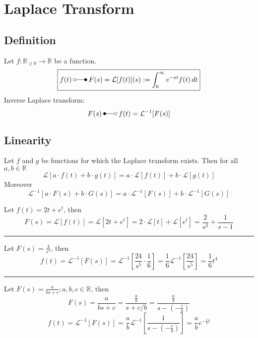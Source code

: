 \section{Laplace Transform}
\subsection{Definition}
Let $f:\mathbb{R}_{\geq 0} \rightarrow \mathbb{R}$ be a function.
\begin{equation*}
    \boxed{
    f(t)\:\laplace\:F(s)=\mathcal{L}[f(t)](s):=\int_{0}^{\infty}e^{-st}f(t)\,dt 
    }
\end{equation*}
Inverse Laplace transform:
\begin{equation*}
    F(s)\:\Laplace\:f(t)=\mathcal{L}^{-1}[F(s)]
\end{equation*} 

\subsection{Linearity}
Let $f$ and $g$ be functions for which the Laplace transform exists. Then for all $a,b \in \mathbb{R}$
\begin{equation*}
    \mathcal{L}[a\cdot f(t)+b\cdot g(t)] = a\cdot\mathcal{L}[f(t)]+b\cdot\mathcal{L}[g(t)]
\end{equation*}
Moreover
\begin{equation*}
    \mathcal{L}^{-1}[a\cdot F(s)+b\cdot G(s)] = a\cdot\mathcal{L}^{-1}[F(s)]+b\cdot\mathcal{L}^{-1}[G(s)]
\end{equation*}

\begin{examplesection}[Example]
    Let $f(t)=2t+e^t$, then
    \begin{equation*}
        F(s)=\mathcal{L}[f(t)]=\mathcal{L}[2t+e^t]=2\cdot\mathcal{L}[t] + \mathcal{L}[e^t]=\frac{2}{s^2}+\frac{1}{s-1}
    \end{equation*}
    \hrule{}
    Let $F(s)=\frac{4}{s^5}$, then
    \begin{equation*}
        f(t)=\mathcal{L}^{-1}[F(s)]=\mathcal{L}^{-1}\left[\frac{24}{s^5}\cdot\frac16\right]=\frac16\mathcal{L}^{-1}\left[\frac{24}{s^5}\right]=\frac16t^4
    \end{equation*}
    \hrule{}
    Let $F(s)=\frac{a}{bs+c}; a,b,c \in \mathbb{R}$, then
    \begin{equation*}
        F(s)=\frac{a}{bs+c}=\frac{\frac{a}{b}}{s+c/b}=\frac{\frac{a}{b}}{s-(-\frac{c}{b})}
    \end{equation*}
    \begin{equation*}
        f(t)=\mathcal{L}^{-1}[F(s)]=\frac{a}{b}\mathcal{L}^{-1}\left[\frac{1}{s-(-\frac{c}{b})}\right]=\frac{a}{b}e^{-\frac{c}{b}t}
    \end{equation*}
\end{examplesection}

